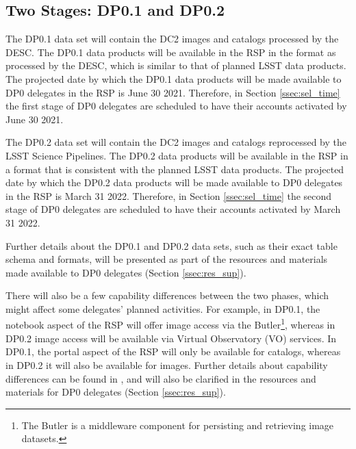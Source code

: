 \documentclass[DM,lsstdraft,authoryear,toc]{lsstdoc}
\begin{document}

\subsection{Two Stages: DP0.1 and DP0.2}\label{ssec:intro_stages}

The DP0.1 data set will contain the DC2 images and catalogs processed by the DESC.
The DP0.1 data products will be available in the RSP in the format as processed by the DESC, which is similar to that of planned LSST data products.
The projected date by which the DP0.1 data products will be made available to DP0 delegates in the RSP is June 30 2021.
Therefore, in Section \ref{ssec:sel_time} the first stage of DP0 delegates are scheduled to have their accounts activated by June 30 2021.

The DP0.2 data set will contain the DC2 images and catalogs reprocessed by the LSST Science Pipelines.
The DP0.2 data products will be available in the RSP in a format that is consistent with the planned LSST data products.
The projected date by which the DP0.2 data products will be made available to DP0 delegates in the RSP is March 31 2022. 
Therefore, in Section \ref{ssec:sel_time} the second stage of DP0 delegates are scheduled to have their accounts activated by March 31 2022.

Further details about the DP0.1 and DP0.2 data sets, such as their exact table schema and formats, will be presented as part of the resources and materials made available to DP0 delegates (Section \ref{ssec:res_sup}).

There will also be a few capability differences between the two phases, which might affect some delegates' planned activities.
For example, in DP0.1, the notebook aspect of the RSP will offer image access via the Butler\footnote{The Butler is a middleware component for persisting and retrieving image datasets.}, whereas in DP0.2 image access will be available via Virtual Observatory (VO) services.
In DP0.1, the portal aspect of the RSP will only be available for catalogs, whereas in DP0.2 it will also be available for images.
Further details about capability differences can be found in , and will also be clarified in the resources and materials for DP0 delegates (Section \ref{ssec:res_sup}).
\end{document}
